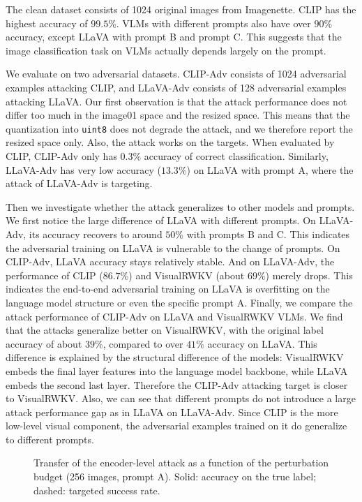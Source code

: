 \documentclass[conference]{IEEEtran}
\begin{document}
The clean dataset consists of 1024 original images from Imagenette. CLIP
has the highest accuracy of $99.5\%$. VLMs with different prompts also have
over $90\%$ accuracy, except LLaVA with prompt B and prompt C. This
suggests that the image classification task on VLMs actually depends
largely on the prompt.

We evaluate on two adversarial datasets. CLIP-Adv consists of 1024
adversarial examples attacking CLIP, and LLaVA-Adv consists of 128
adversarial examples attacking LLaVA. Our first observation is that the
attack performance does not differ too much in the image01 space and the
resized space. This means that the quantization into \texttt{uint8} does
not degrade the attack, and we therefore report the resized space only.
Also, the attack works on the targets. When evaluated by CLIP, CLIP-Adv
only has $0.3\%$ accuracy of correct classification. Similarly, LLaVA-Adv
has very low accuracy ($13.3\%$) on LLaVA with prompt A, where the attack
of LLaVA-Adv is targeting.

Then we investigate whether the attack generalizes to other models and
prompts. We first notice the large difference of LLaVA with different
prompts. On LLaVA-Adv, its accuracy recovers to around $50\%$ with prompts
B and C. This indicates the adversarial training on LLaVA is vulnerable to
the change of prompts. On CLIP-Adv, LLaVA accuracy stays relatively stable.
And on LLaVA-Adv, the performance of CLIP ($86.7\%$) and VisualRWKV (about
$69\%$) merely drops. This indicates the end-to-end adversarial training on
LLaVA is overfitting on the language model structure or even the specific
prompt A. Finally, we compare the attack performance of CLIP-Adv on LLaVA
and VisualRWKV VLMs. We find that the attacks generalize better on
VisualRWKV, with the original label accuracy of about $39\%$, compared to
over $41\%$ accuracy on LLaVA. This difference is explained by the
structural difference of the models: VisualRWKV embeds the final layer
features into the language model backbone, while LLaVA embeds the second
last layer. Therefore the CLIP-Adv attacking target is closer to
VisualRWKV. Also, we can see that different prompts do not introduce a
large attack performance gap as in LLaVA on LLaVA-Adv. Since CLIP is the
more low-level visual component, the adversarial examples trained on it do
generalize to different prompts.

\begin{figure}[t]
  \centering
  
  \caption{Transfer of the encoder-level attack as a function of the
  perturbation budget (256 images, prompt A). Solid: accuracy on the true
  label; dashed: targeted success rate.}
  \label{fig:budget}
\end{figure}
\end{document}
